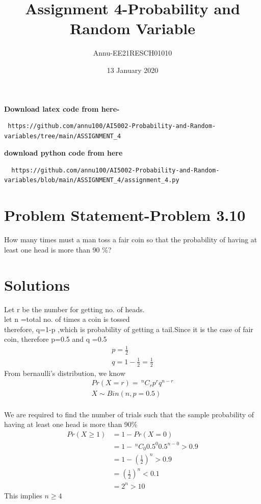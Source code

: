 \documentclass[journel,12pt,twocoloums]{IEEEtran}
\title{Assignment 4-Probability and Random Variable}
\author{Annu-EE21RESCH01010}
\date{13 January 2020}
\providecommand{\nCr}[2]{\,^{#1}C_{#2}}
\begin{document}
 \maketitle
\textbf{Download latex code from here-}\\
\begin{lstlisting}
 https://github.com/annu100/AI5002-Probability-and-Random-variables/tree/main/ASSIGNMENT_4
 \end{lstlisting}
 \textbf{download python code from here}\\
 \begin{lstlisting}
  https://github.com/annu100/AI5002-Probability-and-Random-variables/blob/main/ASSIGNMENT_4/assignment_4.py
 \end{lstlisting}
 \section{Problem Statement-Problem 3.10}
How many times must a man toss a fair coin
so that the probability of having at least one
head is more than 90 \%?
\section{Solutions}

Let r be the number for getting no. of  heads. \\
let n =total no. of times a coin is tossed\\
therefore, q=1-p ,which is probability of getting a tail.Since it is the case of fair coin, therefore p=0.5 and q =0.5\\
\begin{align}
    p=\frac{1}{2} \\
    q=1-\frac{1}{2}=\frac{1}{2}
\end{align}
From bernaulli's distribution, we know\\
\begin{align}
    Pr(X=r)= \nCr{n}{r} p^r q^{n-r}  \\
    X \sim Bin(n,p=0.5)
\end{align}\\

We are required to find the number of trials such that the sample  probability of having at least one
head is more than 90\%\\
\begin{align}
    Pr(X \ge 1) &=1-Pr(X=0)\\
                &=1-\nCr{n}{0} 0.5^0 0.5^{n-0} >0.9 \\
                &=1-(\frac{1}{2})^n >0.9\\
                &=(\frac{1}{2})^n < 0.1\\
                &= 2^{n} >10
\end{align}
This implies $n \ge 4$
\end{document}
